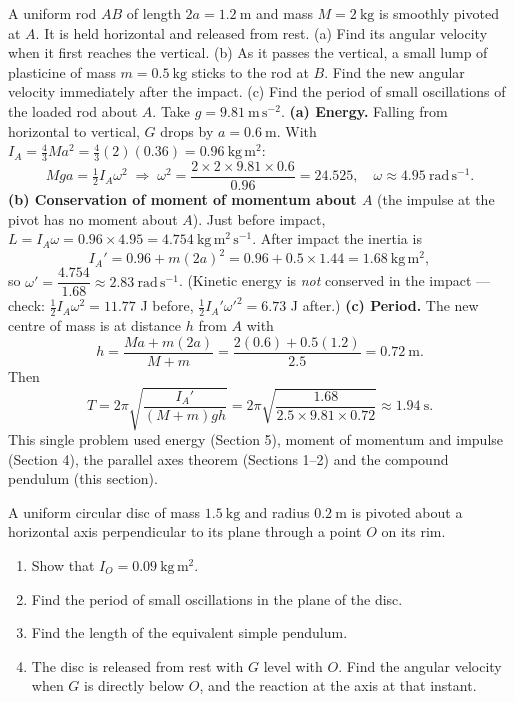 \documentclass[11pt]{article}
\begin{document}
\begin{exoresolu}
A uniform rod $AB$ of length $2a = 1.2\ \mathrm{m}$ and mass $M = 2\ \mathrm{kg}$ is smoothly pivoted at $A$. It is held horizontal and released from rest. (a) Find its angular velocity when it first reaches the vertical. (b) As it passes the vertical, a small lump of plasticine of mass $m = 0.5\ \mathrm{kg}$ sticks to the rod at $B$. Find the new angular velocity immediately after the impact. (c) Find the period of small oscillations of the loaded rod about $A$. Take $g = 9.81\ \mathrm{m\,s^{-2}}$.
\tcblower
\textbf{(a) Energy.} Falling from horizontal to vertical, $G$ drops by $a = 0.6\ \mathrm{m}$. With $I_A = \tfrac{4}{3}Ma^2 = \tfrac{4}{3}(2)(0.36) = 0.96\ \mathrm{kg\,m^2}$:
\[ Mga = \tfrac{1}{2}I_A\omega^2 \;\Longrightarrow\; \omega^2 = \frac{2 \times 2 \times 9.81 \times 0.6}{0.96} = 24.525, \quad \omega \approx 4.95\ \mathrm{rad\,s^{-1}}. \]
\textbf{(b) Conservation of moment of momentum about $A$} (the impulse at the pivot has no moment about $A$). Just before impact, $L = I_A\omega = 0.96 \times 4.95 = 4.754\ \mathrm{kg\,m^2\,s^{-1}}$. After impact the inertia is
\[ I_A' = 0.96 + m(2a)^2 = 0.96 + 0.5 \times 1.44 = 1.68\ \mathrm{kg\,m^2}, \]
so $\omega' = \dfrac{4.754}{1.68} \approx 2.83\ \mathrm{rad\,s^{-1}}$. (Kinetic energy is \emph{not} conserved in the impact — check: $\tfrac12 I_A\omega^2 = 11.77$ J before, $\tfrac12 I_A'\omega'^2 = 6.73$ J after.)
\textbf{(c) Period.} The new centre of mass is at distance $h$ from $A$ with
\[ h = \frac{Ma + m(2a)}{M+m} = \frac{2(0.6) + 0.5(1.2)}{2.5} = 0.72\ \mathrm{m}. \]
Then
\[ T = 2\pi\sqrt{\frac{I_A'}{(M+m)gh}} = 2\pi\sqrt{\frac{1.68}{2.5 \times 9.81 \times 0.72}} \approx 1.94\ \mathrm{s}. \]
This single problem used energy (Section 5), moment of momentum and impulse (Section 4), the parallel axes theorem (Sections 1--2) and the compound pendulum (this section).
\end{exoresolu}

\begin{exercice}
A uniform circular disc of mass $1.5\ \mathrm{kg}$ and radius $0.2\ \mathrm{m}$ is pivoted about a horizontal axis perpendicular to its plane through a point $O$ on its rim.
\begin{enumerate}
\item Show that $I_O = 0.09\ \mathrm{kg\,m^2}$.
\item Find the period of small oscillations in the plane of the disc.
\item Find the length of the equivalent simple pendulum.
\item The disc is released from rest with $G$ level with $O$. Find the angular velocity when $G$ is directly below $O$, and the reaction at the axis at that instant.
\end{enumerate}
\end{exercice}
\end{document}
